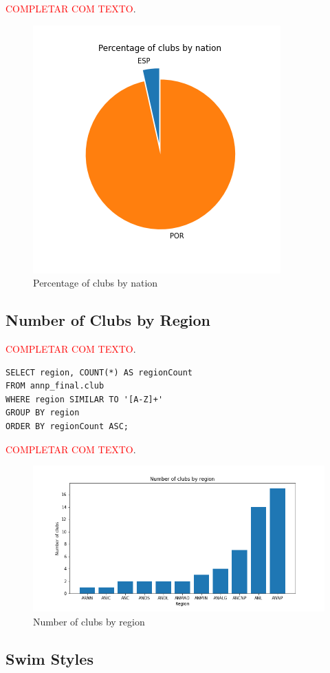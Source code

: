 \textcolor{red}{COMPLETAR COM TEXTO}.

\begin{figure}[H]
    \centering
    \includegraphics[width=.45\textwidth]{img/clubsbynation-pie}
    \caption{Percentage of clubs by nation}
    \label{fig:clubs-by-nation-pie}
\end{figure}

\subsection{Number of Clubs by Region}\label{subsec:number-of-clubs-by-region}

\textcolor{red}{COMPLETAR COM TEXTO}.

\begin{verbatim}
SELECT region, COUNT(*) AS regionCount
FROM annp_final.club
WHERE region SIMILAR TO '[A-Z]+'
GROUP BY region
ORDER BY regionCount ASC;
\end{verbatim}

\textcolor{red}{COMPLETAR COM TEXTO}.

\begin{figure}[H]
    \centering
    \includegraphics[width=.85\textwidth]{img/clubsbyregion}
    \caption{Number of clubs by region}
    \label{fig:clubs-by-region}
\end{figure}

\subsection{Swim Styles}

